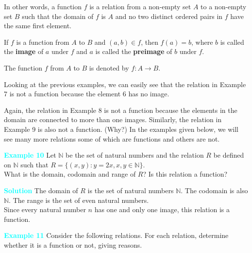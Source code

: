 \documentclass[11pt]{article}
\begin{document}
\vspace{5pt}

 In other words, a function $f$ is a relation from a non-empty set $A$ to a non-empty set $B$ such that the domain of $f$ is $A$ and no two distinct ordered pairs in $f$ have the same first element.

\vspace{5pt}

If $f$ is a function from $A$ to $B$ and $(a, b) \in f$, then $f(a) = b$, where $b$ is called the \textbf{image} of $a$ under $f$ and $a$ is called the \textbf{preimage} of $b$ under $f$.

 The function $f$ from $A$ to $B$ is denoted by $f: A \to B$.

\vspace{10pt}

 Looking at the previous examples, we can easily see that the relation in Example 7 is not a function because the element 6 has no image.

\vspace{5pt}

 Again, the relation in Example 8 is not a function because the elements in the domain are connected to more than one images. Similarly, the relation in Example 9 is also not a function. (Why?) In the examples given below, we will see many more relations some of which are functions and others are not.

 \textcolor{cyan}{
\noindent \textbf{Example 10}} Let $\mathbb{N}$ be the set of natural numbers and the relation $R$ be defined on $\mathbb{N}$ such that $R = \{(x, y) : y = 2x, x, y \in \mathbb{N}\}$. \\
What is the domain, codomain and range of $R$? Is this relation a function?


\vspace{5pt}

\textcolor{cyan}{
\noindent \textbf{Solution}} The domain of $R$ is the set of natural numbers $\mathbb{N}$. The codomain is also $\mathbb{N}$. The range is the set of even natural numbers. \\
Since every natural number $n$ has one and only one image, this relation is a function.

\vspace{15pt}

\textcolor{cyan}{\textbf{Example 11}}  
Consider the following relations. For each relation, determine whether it is a function or not, giving reasons.

\medskip
\end{document}
